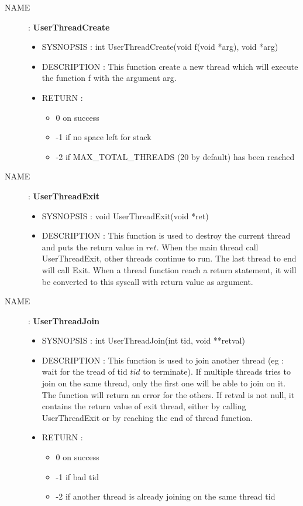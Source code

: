 \documentclass[a4paper,10pt]{article}
\begin{document}
\begin{description}
    \item [NAME] : \textbf{UserThreadCreate}
        \begin{itemize}
            \item SYSNOPSIS : int UserThreadCreate(void f(void *arg), void *arg)
            \item DESCRIPTION :
                This function create a new thread which will execute the function f with the
                argument arg.
            \item RETURN :
                \begin{itemize}
                    \item 0 on success
                    \item -1 if no space left for stack
                    \item -2 if MAX\_TOTAL\_THREADS (20 by default) has been reached
                \end{itemize}
        \end{itemize}


    \item [NAME] : \textbf{UserThreadExit}
        \begin{itemize}
            \item SYSNOPSIS : void UserThreadExit(void *ret)
            \item DESCRIPTION :
                This function is used to destroy the current thread and puts the return value in
                $ret$.
                When the main thread call UserThreadExit, other threads continue to
                run. The last thread to end will call Exit.
                When a thread function reach a return statement, it will be converted
                to this syscall with return value as argument.
        \end{itemize}

    \item [NAME] : \textbf{UserThreadJoin}
        \begin{itemize}
            \item SYSNOPSIS : int UserThreadJoin(int tid, void **retval)
            \item DESCRIPTION :
                This function is used to join another thread (eg : wait for the tread
                of tid $tid$ to terminate). If multiple threads tries to join on the same
                thread, only the first one will be able to join on it. The function
                will return an error for the others.
                If retval is not null, it contains the return value of exit thread,
                either by calling UserThreadExit or by reaching the end of thread function.
            \item RETURN :
                \begin{itemize}
                    \item 0 on success
                    \item -1 if bad tid
                    \item -2 if another thread is already joining on the same thread tid
                \end{itemize}
        \end{itemize}


\end{description}
\end{document}
